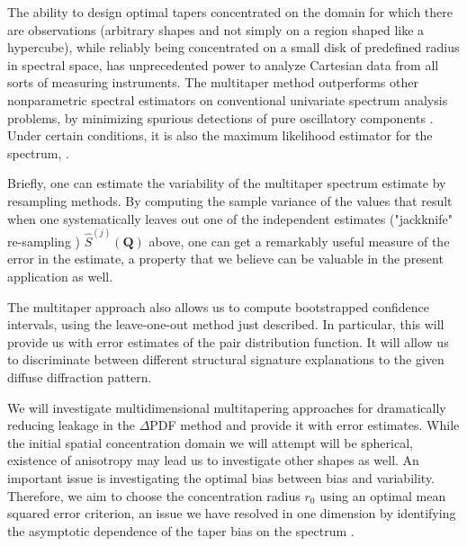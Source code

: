 The ability to design optimal tapers concentrated on the domain for which there are
observations (arbitrary shapes and not simply on a region shaped like a hypercube),
while reliably being concentrated on a small disk of predefined radius in spectral
space, has unprecedented power to analyze Cartesian data from all sorts of measuring
instruments. The multitaper method outperforms other nonparametric spectral
estimators on conventional univariate spectrum analysis problems, by minimizing
spurious detections of pure oscillatory components \cite{th14}. Under certain
conditions, it is also the maximum likelihood estimator for the spectrum,
\cite{stoica99}. 

Briefly, one can estimate the variability of the multitaper spectrum estimate by
resampling methods. By computing the sample variance of the values that result when
one systematically leaves out one of the independent estimates ("jackknife"
re-sampling \cite{efron1981nonparametric}) $\widehat{S}^{(j)}(\mathbf{Q})$ above, one
can get a remarkably useful measure of the error in the estimate, a property that we
believe can be valuable in the present application as well.

 The multitaper approach also allows us to compute bootstrapped confidence intervals,
using the leave-one-out method just described. In particular, this will provide us
with error estimates of the pair distribution function. It will allow us to
discriminate between different structural signature explanations to the given diffuse
diffraction pattern. 

We will investigate multidimensional multitapering approaches for dramatically
reducing leakage in the $\Delta$PDF method and provide it with error estimates. While
the initial spatial concentration domain we will attempt will be spherical, existence
of anisotropy may lead us to investigate other shapes as well. An important issue is
investigating the optimal bias between bias and variability. Therefore, we aim to
choose the concentration radius $r_0$ using an optimal mean squared error criterion,
an issue we have resolved in one dimension by identifying the asymptotic dependence
of the taper bias on the spectrum \cite{ha2017}. 



